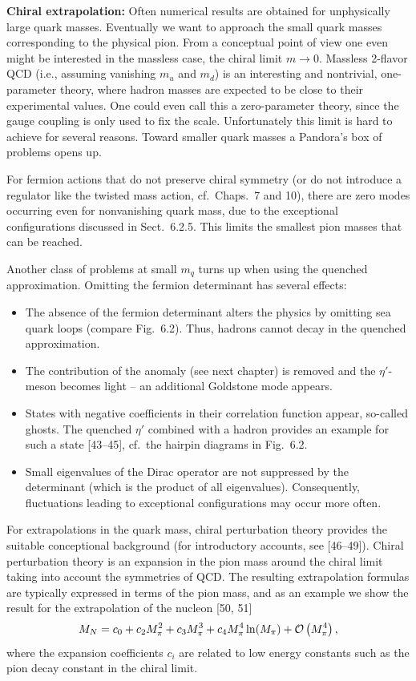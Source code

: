 \textbf{Chiral extrapolation:} Often numerical results are obtained for
unphysically large quark masses. Eventually we want to approach the small quark
masses corresponding to the physical pion. From a conceptual point of view one
even might be interested in the massless case, the chiral limit $m \to 0$.
Massless 2-flavor QCD (i.e., assuming vanishing $m_u$ and $m_d$) is an
interesting and nontrivial, one-parameter theory, where hadron masses are
expected to be close to their experimental values. One could even call this a
zero-parameter theory, since the gauge coupling is only used to fix the scale.
Unfortunately this limit is hard to achieve for several reasons. Toward smaller
quark masses a Pandora's box of problems opens up.

For fermion actions that do not preserve chiral symmetry (or do not introduce a
regulator like the twisted mass action, cf.\ Chaps.~7 and 10), there are zero
modes occurring even for nonvanishing quark mass, due to the exceptional
configurations discussed in Sect.~6.2.5. This limits the smallest pion masses
that can be reached.

Another class of problems at small $m_q$ turns up when using the quenched
approximation. Omitting the fermion determinant has several effects:
\begin{itemize}
  \item The absence of the fermion determinant alters the physics by omitting
        sea quark loops (compare Fig.~6.2). Thus, hadrons cannot decay in the
        quenched approximation.
  \item The contribution of the anomaly (see next chapter) is removed and the
        $\eta'$-meson becomes light -- an additional Goldstone mode appears.
  \item States with negative coefficients in their correlation function appear,
        so-called ghosts. The quenched $\eta'$ combined with a hadron provides
        an example for such a state [43--45], cf.\ the hairpin diagrams in
        Fig.~6.2.
  \item Small eigenvalues of the Dirac operator are not suppressed by the
        determinant (which is the product of all eigenvalues). Consequently,
        fluctuations leading to exceptional configurations may occur more
        often.
\end{itemize}

For extrapolations in the quark mass, chiral perturbation theory provides the
suitable conceptional background (for introductory accounts, see [46--49]).
Chiral perturbation theory is an expansion in the pion mass around the chiral
limit taking into account the symmetries of QCD. The resulting extrapolation
formulas are typically expressed in terms of the pion mass, and as an example
we show the result for the extrapolation of the nucleon [50, 51]
\begin{equation}
  M_N = c_0 + c_2 M_\pi^2 + c_3 M_\pi^3 + c_4 M_\pi^4 \ln(M_\pi)
    + \mathcal{O}\left(M_\pi^4\right) ,
\end{equation}
where the expansion coefficients $c_i$ are related to low energy constants such
as the pion decay constant in the chiral limit.

